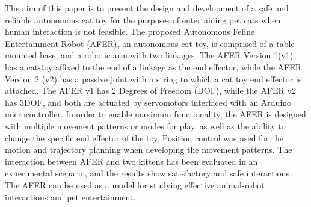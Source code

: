 The aim of this paper is to present the design and development of a safe and reliable autonomous cat toy for the purposes of entertaining pet cats when human interaction is not feasible. The proposed Autonomous Feline Entertainment Robot (AFER), an autonomous cat toy, is comprised of a table-mounted base, and a robotic arm with two linkages. The AFER Version 1(v1) has a cat-toy affixed to the end of a linkage as the end effector, while the AFER Version 2 (v2) has a passive joint with a string to which a cat toy end effector is attached.  The AFER v1 has 2 Degrees of Freedom (DOF), while the AFER v2 has 3DOF, and both are actuated by servomotors interfaced with an Arduino microcontroller. In order to enable maximum functionality, the AFER is designed with multiple movement patterns or modes for play, as well as the ability to change the specific end effector of the toy. Position control was used for the motion and trajectory planning when developing the movement patterns. The interaction between AFER and two kittens has been evaluated in an experimental scenario, and the results show satisfactory and safe interactions. The AFER can be used as a model for studying effective animal-robot interactions and pet entertainment.
